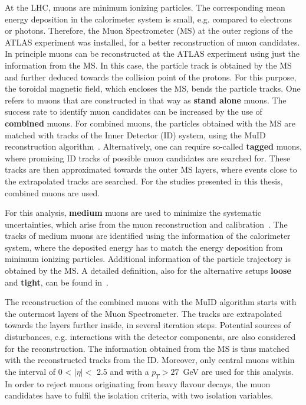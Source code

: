 At the LHC, muons are minimum ionizing particles. The corresponding mean energy deposition in the calorimeter system is small, e.g. compared to electrons or photons. Therefore, the Muon Spectrometer (MS) at the outer regions of the ATLAS experiment was installed, for a better reconstruction of muon candidates.  In principle muons can be reconstructed at the ATLAS experiment using just the information from the MS. In this case, the particle track is obtained by the MS and further deduced towards the collision point of the protons. For this purpose, the toroidal magnetic field, which encloses the MS, bends the particle tracks.  One refers to muons that are constructed in that way as \textbf{stand alone} muons. 
The success rate to identify muon candidates can be increased by the use of \textbf{combined} muons. For combined muons, the particles obtained with the MS are matched with tracks of the Inner Detector (ID) system, using the MuID reconstruction algorithm~\cite{Aad:2014rra}. Alternatively, one can require so-called \textbf{tagged} muons, where  promising ID tracks of possible muon candidates are searched for. These tracks are then approximated towards the outer MS layers, where events  close to the extrapolated tracks  are searched. For the studies presented in this thesis, combined muons are used.


 
 
For this analysis, \textbf{medium} muons are used to minimize the systematic uncertainties, which arise from the muon reconstruction and calibration~\cite{Aad:2016jkr}. The tracks of medium muons are identified using the information of the calorimeter system, where the  deposited energy has to match the energy deposition from  minimum ionizing particles. Additional information of the particle trajectory is obtained by the MS. A detailed definition, also for the alternative setups \textbf{loose}  and \textbf{tight}, can be found in~\cite{Aad:2016jkr}.
 

  
 The reconstruction of the combined muons with the MuID algorithm starts with the outermost layers of the Muon Spectrometer. The tracks are extrapolated towards the layers further inside, in several iteration steps. Potential sources of disturbances, e.g. interactions with the detector components, are also considered for the reconstruction. The information obtained from the MS is thus matched with the reconstructed tracks from the ID. Moreover, only central muons  within the interval of 0 < $\mid\eta\mid < $ 2.5 and with a $p_T>27$~GeV  are used for this analysis. In order to reject muons originating from heavy flavour decays, the muon candidates have to fulfil the isolation criteria, with two isolation variables.

